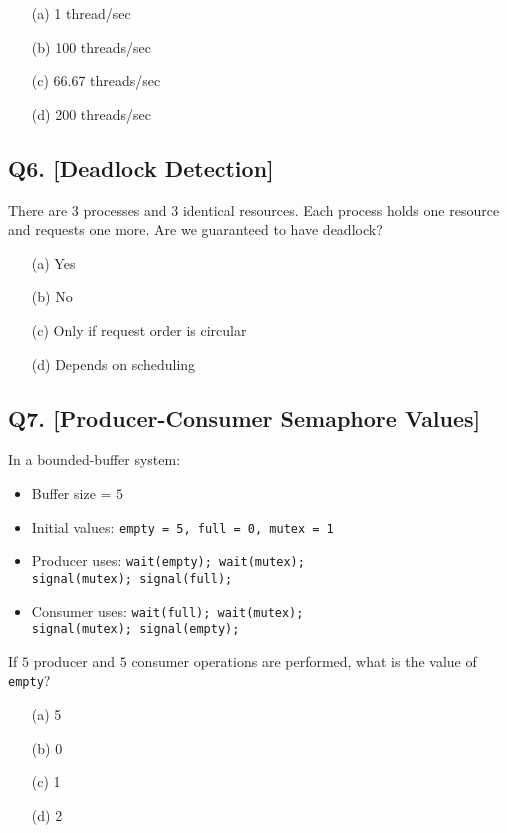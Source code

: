 \begin{itemize}
    \item[(a)] 1 thread/sec
    \item[(b)] 100 threads/sec
    \item[(c)] 66.67 threads/sec
    \item[(d)] 200 threads/sec
\end{itemize}

\vspace{1em}

\subsection*{Q6. [Deadlock Detection]}
There are $3$ processes and $3$ identical resources. Each process holds one resource and requests one more. Are we guaranteed to have deadlock?

\begin{itemize}
    \item[(a)] Yes
    \item[(b)] No
    \item[(c)] Only if request order is circular
    \item[(d)] Depends on scheduling
\end{itemize}

\vspace{1em}

\subsection*{Q7. [Producer-Consumer Semaphore Values]}
In a bounded-buffer system:
\begin{itemize}
    \item Buffer size = $5$
    \item Initial values: \texttt{empty = 5, full = 0, mutex = 1}
    \item Producer uses: \texttt{wait(empty); wait(mutex);\\ signal(mutex); signal(full);}
    \item Consumer uses: \texttt{wait(full); wait(mutex);\\ signal(mutex); signal(empty);}
\end{itemize}
If $5$ producer and $5$ consumer operations are performed, what is the value of \texttt{empty}?

\begin{itemize}
    \item[(a)] 5
    \item[(b)] 0
    \item[(c)] 1
    \item[(d)] 2
\end{itemize}

